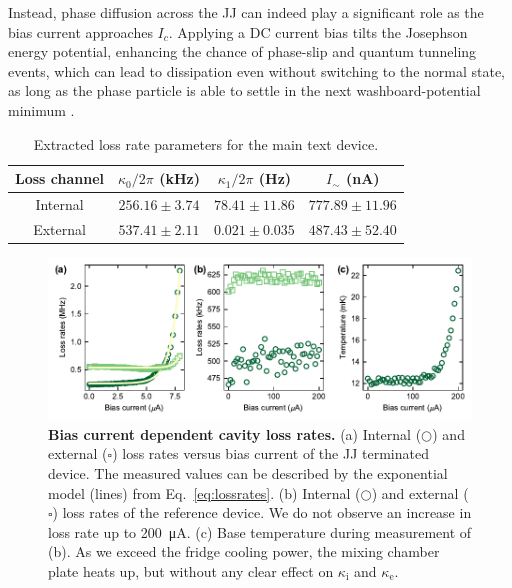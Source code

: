 \begin{description}
	Instead, phase diffusion across the JJ can indeed play a significant role as the bias current approaches $I_c$.
	Applying a DC current bias tilts the Josephson energy potential, enhancing the chance of phase-slip and quantum tunneling events, which can lead to dissipation even without switching to the normal state, as long as the phase particle is able to settle in the next washboard-potential minimum \cite{kiviojaWeakCouplingJosephson2005}.
\end{description}

\begin{table}
	\centering
	\caption{Extracted loss rate parameters for the main text device.\label{tab:lossrates}}
	\begin{tabular}{cccc}
		\hline \hline
		Loss channel         & $\kappa_0/2\pi$ (\si{\kilo\hertz}) & $\kappa_1/2\pi$ (\si{\hertz}) & $I_{\sim}$ (\si{\nano\ampere}) \\
		\hline
		Internal & $256.16 \pm 3.74$             & $78.41 \pm 11.86$      & $777.89 \pm 11.96$             \\
		External & $537.41 \pm 2.11$             & $0.021 \pm 0.035$      & $487.43 \pm 52.40	$             \\
		\hline \hline
	\end{tabular}
\end{table}

\begin{figure}
	\centering
	\includegraphics[width=\linewidth]{chapter-currentdetection/figures/SM_lossrates}
	\caption{
		\textbf{Bias current dependent cavity loss rates.}
		(a) Internal ($\bigcirc$) and external ($\square$) loss rates versus bias current of the JJ terminated device. The measured values can be described by the exponential model (lines) from Eq.~\eqref{eq:lossrates}.
		(b) Internal ($\bigcirc$) and external ($\square$) loss rates of the reference device.
		We do not observe an increase in loss rate up to \SI{200}{\micro\ampere}.
		(c) Base temperature during measurement of (b).
		As we exceed the fridge cooling power, the mixing chamber plate heats up, but without any clear effect on $\kappa_\text{i}$ and $\kappa_\text{e}$.
	}
	\label{fig:lossratesvscurrent}
\end{figure}

